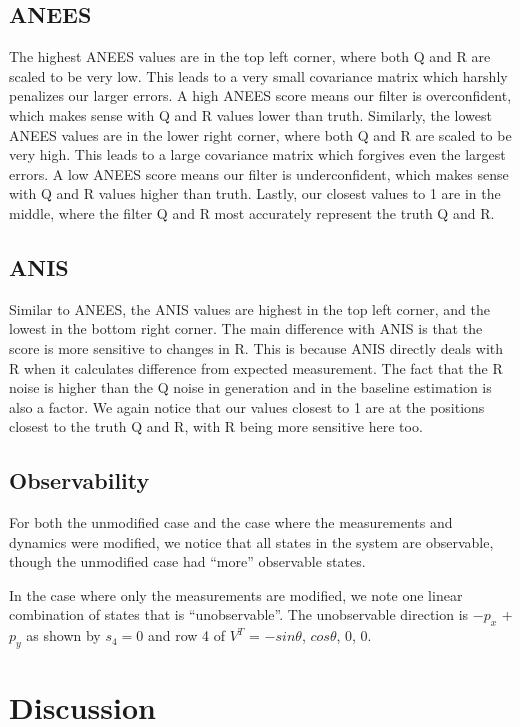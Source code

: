 \documentclass[11pt, letterpaper, twocolumn]{article}
\begin{document}
\subsection*{ANEES}

The highest ANEES values are in the top left corner, where both Q and R
are scaled to be very low. This leads to a very small covariance matrix
which harshly penalizes our larger errors. A high ANEES score means our
filter is overconfident, which makes sense with Q and R values lower than
truth. Similarly, the lowest ANEES values are in the lower right corner,
where both Q and R are scaled to be very high. This leads to a large covariance
matrix which forgives even the largest errors. A low ANEES score means our 
filter is underconfident, which makes sense with Q and R values higher
than truth. Lastly, our closest values to 1 are in the middle, where the
filter Q and R most accurately represent the truth Q and R.

\subsection*{ANIS}

Similar to ANEES, the ANIS values are highest in the top left corner,
and the lowest in the bottom right corner. The main difference with ANIS
is that the score is more sensitive to changes in R. This is because 
ANIS directly deals with R when it calculates difference from expected 
measurement. The fact that the R noise is higher than the Q noise in 
generation and in the baseline estimation is also a factor. We again
notice that our values closest to 1 are at the positions closest to 
the truth Q and R, with R being more sensitive here too.

\subsection*{Observability}

For both the unmodified case and the case where the measurements and
dynamics were modified, we notice that all states in the system are
observable, though the unmodified case had ``more'' observable states.

In the case where only the measurements are modified, we note one 
linear combination of states that is ``unobservable''. The unobservable
direction is $-p_x$ + $p_y$ as shown by $s_4 = 0$ and row 4 of 
$V^T$ = $-sin\theta$, $cos\theta$, 0, 0.

\section*{Discussion}
\end{document}

